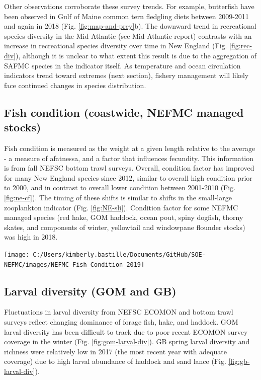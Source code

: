 \documentclass[10pt,]{article}
\let\origfigure\figure
\let\endorigfigure\endfigure
\renewenvironment{figure}[1][2] {
    \expandafter\origfigure\expandafter[H]
} {
    \endorigfigure
}
\begin{document}
Other observations corroborate these survey trends. For example,
butterfish have been observed in Gulf of Maine common tern fledgling
diets between 2009-2011 and again in 2018 (Fig.
\ref{fig:map-and-prey}b). The downward trend in recreational species
diversity in the Mid-Atlantic (see Mid-Atlantic report) contrasts with
an increase in recreational species diversity over time in New England
(Fig. \ref{fig:rec-div}), although it is unclear to what extent this
result is due to the aggregation of SAFMC species in the indicator
itself. As temperature and ocean circulation indicators trend toward
extremes (next section), fishery management will likely face continued
changes in species distribution.

\subsection{Fish condition (coastwide, NEFMC managed
stocks)}\label{fish-condition-coastwide-nefmc-managed-stocks}

Fish condition is measured as the weight at a given length relative to
the average - a measure of afatnessa, and a factor that influences
fecundity. This information is from fall NEFSC bottom trawl surveys.
Overall, condition factor has improved for many New England species
since 2012, similar to overall high condition prior to 2000, and in
contrast to overall lower condition between 2001-2010 (Fig.
\ref{fig:ne-cf}). The timing of these shifts is similar to shifts in the
small-large zooplankton indicator (Fig. \ref{fig:NE-sli}). Condition
factor for some NEFMC managed species (red hake, GOM haddock, ocean
pout, spiny dogfish, thorny skates, and components of winter, yellowtail
and windowpane flounder stocks) was high in 2018.

\begin{figure}

{\centering \texttt{[image: C:/Users/kimberly.bastille/Documents/GitHub/SOE-NEFMC/images/NEFMC\_Fish\_Condition\_2019]} 

}

\caption{Condition factor for NEFMC managed species.}\label{fig:ne-cf}
\end{figure}

\subsection{Larval diversity (GOM and
GB)}\label{larval-diversity-gom-and-gb}

Fluctuations in larval diversity from NEFSC ECOMON and bottom trawl
surveys reflect changing dominance of forage fish, hake, and haddock.
GOM larval diversity has been difficult to track due to poor recent
ECOMON survey coverage in the winter (Fig. \ref{fig:gom-larval-div}). GB
spring larval diversity and richness were relatively low in 2017 (the
most recent year with adequate coverage) due to high larval abundance of
haddock and sand lance (Fig. \ref{fig:gb-larval-div}).
\end{document}
